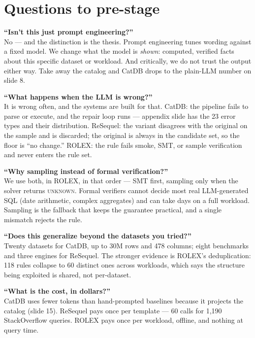 \documentclass[11pt]{article}
\begin{document}
\section*{Questions to pre-stage}

\noindent\textbf{``Isn't this just prompt engineering?''}\\
No --- and the distinction is the thesis. Prompt engineering tunes wording
against a fixed model. We change what the model is \emph{shown}: computed,
verified facts about this specific dataset or workload. And critically, we do
not trust the output either way. Take away the catalog and CatDB drops to the
plain-LLM number on slide 8.

\noindent\textbf{``What happens when the LLM is wrong?''}\\
It is wrong often, and the systems are built for that. CatDB: the pipeline
fails to parse or execute, and the repair loop runs --- appendix slide has the
23 error types and their distribution. ReSequel: the variant disagrees with the
original on the sample and is discarded; the original is always in the
candidate set, so the floor is ``no change.'' ROLEX: the rule fails smoke, SMT,
or sample verification and never enters the rule set.

\noindent\textbf{``Why sampling instead of formal verification?''}\\
We use both, in ROLEX, in that order --- SMT first, sampling only when the
solver returns \textsc{unknown}. Formal verifiers cannot decide most real
LLM-generated SQL (date arithmetic, complex aggregates) and can take days on a
full workload. Sampling is the fallback that keeps the guarantee practical, and
a single mismatch rejects the rule.

\noindent\textbf{``Does this generalize beyond the datasets you tried?''}\\
Twenty datasets for CatDB, up to 30M rows and 478 columns; eight benchmarks and
three engines for ReSequel. The stronger evidence is ROLEX's deduplication: 118
rules collapse to 60 distinct ones across workloads, which says the structure
being exploited is shared, not per-dataset.

\noindent\textbf{``What is the cost, in dollars?''}\\
CatDB uses fewer tokens than hand-prompted baselines because it projects the
catalog (slide 15). ReSequel pays once per template --- 60 calls for 1,190
StackOverflow queries. ROLEX pays once per workload, offline, and nothing at
query time.
\end{document}

